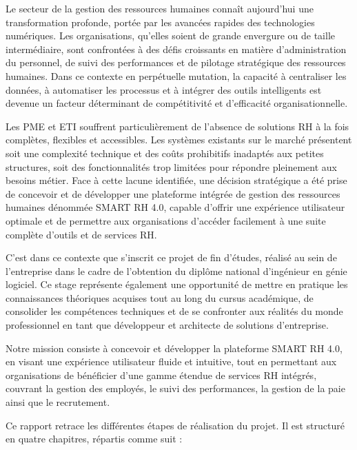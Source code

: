 
Le secteur de la gestion des ressources humaines connaît aujourd'hui une transformation profonde, portée par les avancées rapides des technologies numériques. Les organisations, qu'elles soient de grande envergure ou de taille intermédiaire, sont confrontées à des défis croissants en matière d'administration du personnel, de suivi des performances et de pilotage stratégique des ressources humaines. Dans ce contexte en perpétuelle mutation, la capacité à centraliser les données, à automatiser les processus et à intégrer des outils intelligents est devenue un facteur déterminant de compétitivité et d'efficacité organisationnelle.

Les PME et ETI souffrent particulièrement de l'absence de solutions RH à la fois complètes, flexibles et accessibles. Les systèmes existants sur le marché présentent soit une complexité technique et des coûts prohibitifs inadaptés aux petites structures, soit des fonctionnalités trop limitées pour répondre pleinement aux besoins métier. Face à cette lacune identifiée, une décision stratégique a été prise de concevoir et de développer une plateforme intégrée de gestion des ressources humaines dénommée SMART RH 4.0, capable d'offrir une expérience utilisateur optimale et de permettre aux organisations d'accéder facilement à une suite complète d'outils et de services RH.

C'est dans ce contexte que s'inscrit ce projet de fin d'études, réalisé au sein de l'entreprise dans le cadre de l'obtention du diplôme national d'ingénieur en génie logiciel. Ce stage représente également une opportunité de mettre en pratique les connaissances théoriques acquises tout au long du cursus académique, de consolider les compétences techniques et de se confronter aux réalités du monde professionnel en tant que développeur et architecte de solutions d'entreprise.

Notre mission consiste à concevoir et développer la plateforme SMART RH 4.0, en visant une expérience utilisateur fluide et intuitive, tout en permettant aux organisations de bénéficier d'une gamme étendue de services RH intégrés, couvrant la gestion des employés, le suivi des performances, la gestion de la paie ainsi que le recrutement.

Ce rapport retrace les différentes étapes de réalisation du projet. Il est structuré en quatre chapitres, répartis comme suit :

